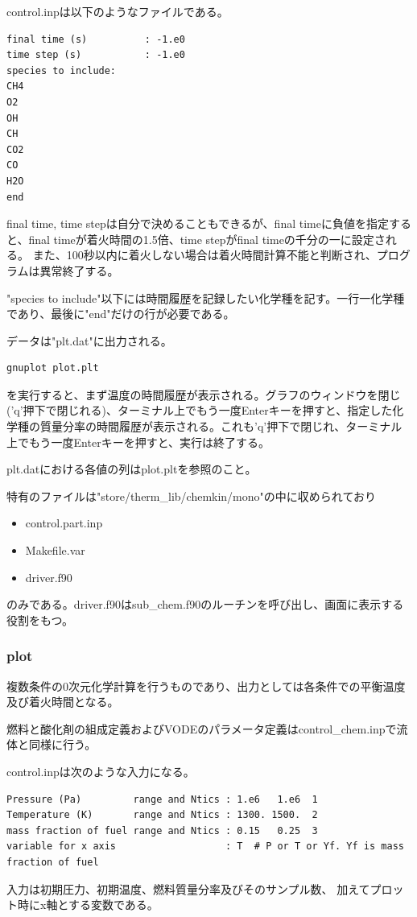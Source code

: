 \documentclass{jsarticle}
\begin{document}
control.inpは以下のようなファイルである。
\begin{verbatim}
final time (s)          : -1.e0
time step (s)           : -1.e0
species to include:
CH4
O2
OH
CH
CO2
CO
H2O
end
\end{verbatim}
final time, time stepは自分で決めることもできるが、final timeに負値を指定すると、final timeが着火時間の1.5倍、time stepがfinal timeの千分の一に設定される。
また、100秒以内に着火しない場合は着火時間計算不能と判断され、プログラムは異常終了する。

"species to include"以下には時間履歴を記録したい化学種を記す。一行一化学種であり、最後に"end"だけの行が必要である。

データは"plt.dat"に出力される。
\begin{verbatim}
gnuplot plot.plt
\end{verbatim}
を実行すると、まず温度の時間履歴が表示される。グラフのウィンドウを閉じ('q'押下で閉じれる)、ターミナル上でもう一度Enterキーを押すと、指定した化学種の質量分率の時間履歴が表示される。これも'q'押下で閉じれ、ターミナル上でもう一度Enterキーを押すと、実行は終了する。

plt.datにおける各値の列はplot.pltを参照のこと。

\hspace{1em}

特有のファイルは"store/therm\_lib/chemkin/mono"の中に収められており
\begin{itemize}
\item control.part.inp
\item Makefile.var
\item driver.f90
\end{itemize}
のみである。driver.f90はsub\_chem.f90のルーチンを呼び出し、画面に表示する役割をもつ。

\subsubsection{plot}%
複数条件の0次元化学計算を行うものであり、出力としては各条件での平衡温度及び着火時間となる。

燃料と酸化剤の組成定義およびVODEのパラメータ定義はcontrol\_chem.inpで流体と同様に行う。

control.inpは次のような入力になる。
\begin{verbatim}
Pressure (Pa)         range and Ntics : 1.e6   1.e6  1
Temperature (K)       range and Ntics : 1300. 1500.  2
mass fraction of fuel range and Ntics : 0.15   0.25  3
variable for x axis                   : T  # P or T or Yf. Yf is mass fraction of fuel
\end{verbatim}
入力は初期圧力、初期温度、燃料質量分率及びそのサンプル数、
加えてプロット時にx軸とする変数である。
\end{document}
